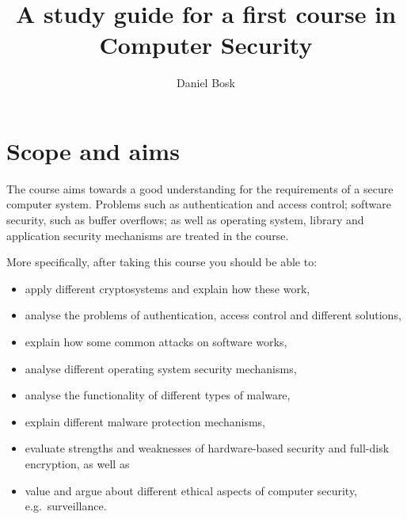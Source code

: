 \title{%
  A study guide for a first course in\\
  Computer Security
}
\author{%
  Daniel Bosk
}

\maketitle


\section{Scope and aims}
\label{sec:aim}
The course aims towards a good understanding for the requirements of a secure 
computer system.
Problems such as authentication and access control; software security, such as 
buffer overflows; as well as operating system, library and application security 
mechanisms are treated in the course.

More specifically, after taking this course you should be able to:
\begin{itemize}
  \item apply different cryptosystems and explain how these work,
  \item analyse the problems of authentication, access control and different 
  solutions,
  \item explain how some common attacks on software works,
  \item analyse different operating system security mechanisms,
  \item analyse the functionality of different types of malware,
  \item explain different malware protection mechanisms,
  \item evaluate strengths and weaknesses of hardware-based security and 
    full-disk encryption, as well as
  \item value and argue about different ethical aspects of computer security, 
    e.g.\ surveillance.
\end{itemize}



